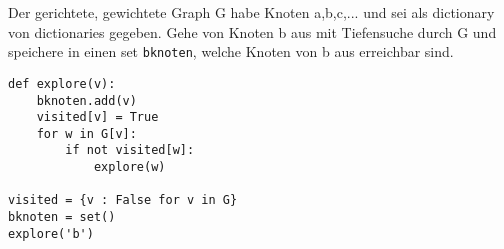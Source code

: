 ﻿\question[6]
Der gerichtete, gewichtete Graph G habe Knoten a,b,c,... und
sei als dictionary von dictionaries gegeben. Gehe von Knoten b aus mit Tiefensuche
durch G und speichere in einen set \texttt{bknoten}, welche Knoten von b aus erreichbar sind.

\begin{solutionbox}{13cm}
\begin{lstlisting}
def explore(v):
    bknoten.add(v)
    visited[v] = True
    for w in G[v]:
        if not visited[w]:
            explore(w)

visited = {v : False for v in G}
bknoten = set()
explore('b')

\end{lstlisting}
\end{solutionbox}
